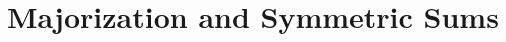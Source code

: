 \documentclass{subfile}
\begin{document}
	\section{Majorization and Symmetric Sums}\label{sec:mazorization}
\end{document}
